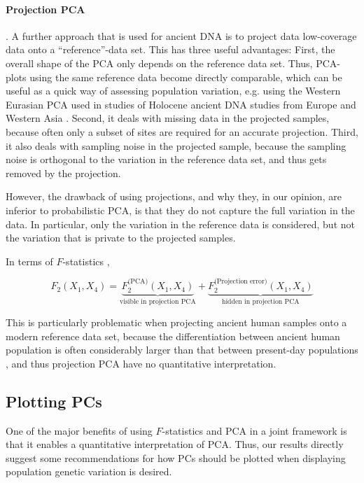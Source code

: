 \documentclass[12pt, letterpaper]{article}
\begin{document}
\paragraph{Projection PCA}. A further approach that is used for ancient DNA is to project data low-coverage data onto a ``reference''-data set. This has three useful advantages: First, the overall shape of the PCA only depends on the reference data set. Thus, PCA-plots using the same reference data become directly comparable, which can be useful as a quick way of assessing population variation, e.g. using the Western Eurasian PCA used in studies of Holocene ancient DNA studies from Europe and Western Asia \citep{haak_massive_2015}. Second, it deals with missing data in the projected samples, because often only a subset of sites are required for an accurate projection. Third, it also deals with sampling noise in the projected sample, because the sampling noise is orthogonal to the variation in the reference data set, and thus gets removed by the projection.

However, the drawback of using projections, and why they, in our opinion, are inferior to probabilistic PCA, is that they do not capture the full variation in the data. In particular, only the variation in the reference data is considered, but not the variation that is private to the projected samples. 

In terms of $F$-statistics \cite{peter_geometric_2022}, 

\begin{equation*}
    F_2(X_1, X_4) = \underbrace{F_2^{\text{(PCA)}}(X_1, X_4)}_{\text{visible in projection PCA}} + \underbrace{F_2^{\text{(Projection error)}}(X_1, X_4)}_{\text{hidden in projection PCA}}
\end{equation*}

This is particularly problematic when projecting ancient human samples onto a modern reference data set, because the differentiation between ancient human population is often considerably larger than that between present-day populations \citep{haak_massive_2015, lazaridis_ancient_2014}, and thus projection PCA have no quantitative interpretation.


\subsection{Plotting PCs}
One of the major benefits of using $F$-statistics and PCA in a joint framework is that it enables a quantitative interpretation of PCA. Thus, our results directly suggest some recommendations for how PCs should be plotted when displaying population genetic variation is desired. 
\end{document}
